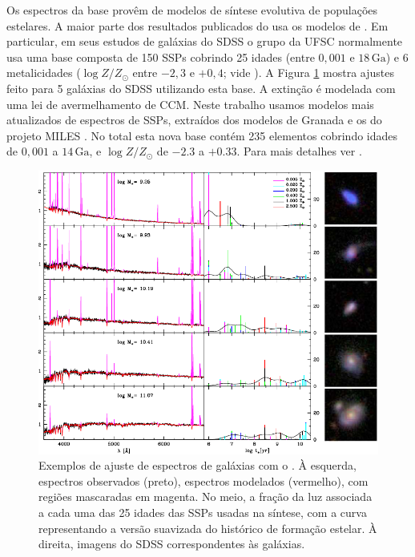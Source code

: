 Os espectros da base provêm de modelos de síntese evolutiva de populações
estelares. A maior parte dos resultados publicados do \starlight usa os modelos
de \citet[BC03]{Bruzual2003}. Em particular, em seus estudos de galáxias do SDSS
o grupo da UFSC normalmente usa uma base composta de 150 SSPs cobrindo 25 idades
(entre $0,001$ e $18\,\mathrm{Ga}$) e 6 metalicidades ($\log Z/Z_\odot$ entre
$-2,3$ e $+0,4$; vide \citet{Mateus2006}). A Figura
\ref{fig:StarlightSpectrumSample} mostra ajustes feito para 5 galáxias do SDSS
utilizando esta base. A extinção é modelada com uma lei de avermelhamento de
CCM. Neste trabalho usamos modelos mais atualizados de espectros de SSPs,
extraídos dos modelos de Granada \citep[para idades até
$63\,\mathrm{Ma}$]{GonzalezDelgado2005} e os do projeto MILES \citep[para idades
maiores que $63\,\mathrm{Ma}$]{Vazdekis2010}. No total esta nova base contém 235
elementos cobrindo idades de  $0,001$ a $14\,\mathrm{Ga}$, e $\log Z/Z_\odot$ de
$-2.3$ a $+0.33$.
Para mais detalhes ver \citet{GonzalezDelgado2014b, GonzalezDelgado2014a}.

\begin{figure}
	\includegraphics[width=1.0\textwidth]{figuras/starlight-fit}
	\caption[Exemplos de ajuste de espectro com o \starlight.]
	{Exemplos de ajuste de espectros de galáxias com o \starlight
	\citep{Asari2007}. À esquerda, espectros observados (preto), espectros
	modelados (vermelho), com regiões mascaradas em magenta. No meio, a fração da
	luz associada a cada uma das 25 idades das SSPs usadas na síntese, com a curva
	representando a versão suavizada do histórico de formação estelar. À direita,
	imagens do SDSS correspondentes às galáxias.}
	\label{fig:StarlightSpectrumSample}
\end{figure}

